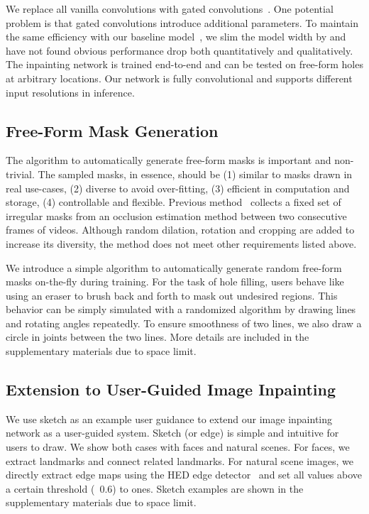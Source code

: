 \documentclass[10pt,twocolumn,letterpaper]{article}
\begin{document}
We replace all vanilla convolutions with gated convolutions~\cite{yu2018generative}. One potential problem is that gated convolutions introduce additional parameters. To maintain the same efficiency with our baseline model~\cite{yu2018generative}, we slim the model width by  and have not found obvious performance drop both quantitatively and qualitatively. The inpainting network is trained end-to-end and can be tested on free-form holes at arbitrary locations. Our network is fully convolutional and supports different input resolutions in inference.

\subsection{Free-Form Mask Generation}
The algorithm to automatically generate free-form masks is important and non-trivial. The sampled masks, in essence, should be (1) similar to masks drawn in real use-cases, (2) diverse to avoid over-fitting, (3) efficient in computation and storage, (4) controllable and flexible. Previous method~\cite{liu2018image} collects a fixed set of irregular masks from an occlusion estimation method between two consecutive frames of videos. Although random dilation, rotation and cropping are added to increase its diversity, the method does not meet other requirements listed above.

We introduce a simple algorithm to automatically generate random free-form masks on-the-fly during training. For the task of hole filling, users behave like using an eraser to brush back and forth to mask out undesired regions. This behavior can be simply simulated with a randomized algorithm by drawing lines and rotating angles repeatedly. To ensure smoothness of two lines, we also draw a circle in joints between the two lines. More details are included in the supplementary materials  due to space limit.


\subsection{Extension to User-Guided Image Inpainting}
We use sketch as an example user guidance to extend our image inpainting network as a user-guided system. Sketch (or edge) is simple and intuitive for users to draw. We show both cases with faces and natural scenes. For faces, we extract landmarks and connect related landmarks. For natural scene images, we directly extract edge maps using the HED edge detector~\cite{xie2015holistically} and set all values above a certain threshold (\ie~0.6) to ones. Sketch examples are shown in the supplementary materials due to space limit.
\end{document}
